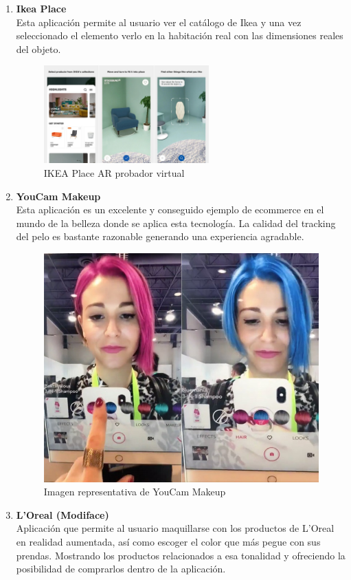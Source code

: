 \begin{enumerate}
\item \textbf{Ikea Place}\\
Esta aplicación permite al usuario ver el catálogo de Ikea y una vez seleccionado el elemento verlo en la habitación real con las dimensiones reales del objeto.
\begin{figure}[H]
     \centering
     \includegraphics[width=0.6\textwidth]{Images/Ikea_App.jpeg}
     \caption{IKEA Place AR probador virtual}
     \label{fig:Ikea}
 \end{figure}
 \item
 \textbf{YouCam Makeup}\\
Esta aplicación es un excelente y conseguido ejemplo de ecommerce en el mundo de la belleza donde se aplica esta tecnología. La calidad del tracking del pelo es bastante razonable generando una experiencia agradable.
\begin{figure}[H]
    \centering
    \includegraphics{Images/Loreal_App.jpeg}
    \caption{Imagen representativa de YouCam Makeup}
    \label{fig:YouCam}
\end{figure}
\item \textbf{L’Oreal (Modiface)}\\
Aplicación que permite al usuario maquillarse con los productos de L’Oreal en realidad aumentada, así como escoger el color que más pegue con sus prendas. Mostrando los productos relacionados a esa tonalidad y ofreciendo la posibilidad de comprarlos dentro de la aplicación.
\end{enumerate}

\noindent
